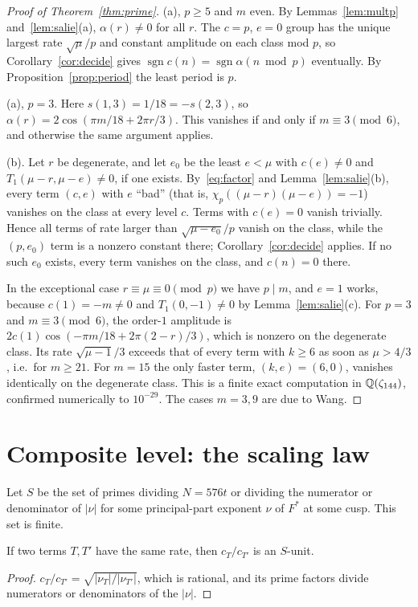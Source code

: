 \documentclass[11pt]{amsart}
\theoremstyle{definition}\newtheorem{definition}[theorem]{Definition}
\theoremstyle{remark}\newtheorem{remark}[theorem]{Remark}
\newcommand{\sgn}{\operatorname{sgn}}\newcommand{\lcm}{\operatorname{lcm}}
\begin{document}
\begin{proof}[Proof of Theorem~\ref{thm:prime}]
(a), $p\ge5$ and $m$ even. By Lemmas~\ref{lem:multp} and~\ref{lem:salie}(a), $\alpha(r)\ne0$ for all $r$. The $c=p$, $e=0$ group has the unique largest rate $\sqrt\mu/p$ and constant amplitude on each class mod $p$, so Corollary~\ref{cor:decide} gives $\sgn c(n)=\sgn\alpha(n\bmod p)$ eventually. By Proposition~\ref{prop:period} the least period is $p$.

(a), $p=3$. Here $s(1,3)=1/18=-s(2,3)$, so $\alpha(r)=2\cos(\pi m/18+2\pi r/3)$. This vanishes if and only if $m\equiv3\pmod6$, and otherwise the same argument applies.

(b). Let $r$ be degenerate, and let $e_0$ be the least $e<\mu$ with $c(e)\ne0$ and $T_1(\mu-r,\mu-e)\ne0$, if one exists. By~\eqref{eq:factor} and Lemma~\ref{lem:salie}(b), every term $(c,e)$ with $e$ ``bad'' (that is, $\chi_p((\mu-r)(\mu-e))=-1$) vanishes on the class at every level $c$. Terms with $c(e)=0$ vanish trivially. Hence all terms of rate larger than $\sqrt{\mu-e_0}/p$ vanish on the class, while the $(p,e_0)$ term is a nonzero constant there; Corollary~\ref{cor:decide} applies. If no such $e_0$ exists, every term vanishes on the class, and $c(n)=0$ there.

In the exceptional case $r\equiv\mu\equiv0\pmod p$ we have $p\mid m$, and $e=1$ works, because $c(1)=-m\ne0$ and $T_1(0,-1)\ne0$ by Lemma~\ref{lem:salie}(c). For $p=3$ and $m\equiv3\pmod6$, the order-$1$ amplitude is $2c(1)\cos(-\pi m/18+2\pi(2-r)/3)$, which is nonzero on the degenerate class. Its rate $\sqrt{\mu-1}/3$ exceeds that of every term with $k\ge6$ as soon as $\mu>4/3$, i.e.\ for $m\ge21$. For $m=15$ the only faster term, $(k,e)=(6,0)$, vanishes identically on the degenerate class. This is a finite exact computation in $\mathbb Q(\zeta_{144})$, confirmed numerically to $10^{-29}$. The cases $m=3,9$ are due to Wang.
\end{proof}

\section{Composite level: the scaling law}\label{sec:scaling}
Let $S$ be the set of primes dividing $N=576t$ or dividing the numerator or denominator of $|\nu|$ for some principal-part exponent $\nu$ of $F^\ast$ at some cusp. This set is finite.

\begin{lemma}\label{lem:sunit}
If two terms $T,T'$ have the same rate, then $c_T/c_{T'}$ is an $S$-unit.
\end{lemma}
\begin{proof}
$c_T/c_{T'}=\sqrt{|\nu_T|/|\nu_{T'}|}$, which is rational, and its prime factors divide numerators or denominators of the $|\nu|$.
\end{proof}
\end{document}
